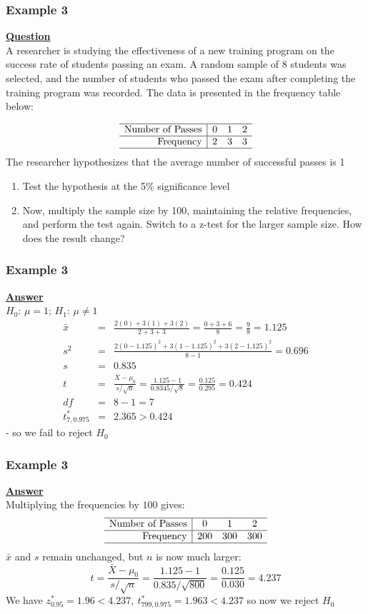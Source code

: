 \documentclass[t,8pt]{beamer}%
\begin{document}
\begin{frame}
	\frametitle{Example 3}
    {\bf\underline{Question}} \\
    A researcher is studying the effectiveness of a new training program on the success rate of students passing an exam. A random sample of 8 students was selected, and the number of students who passed the exam after completing the training program was recorded. The data is presented in the frequency table below:

\[
\begin{array}{r|ccc}
\hline
\text{Number of Passes} & 0 & 1 & 2 \\
\hline
\text{Frequency} & 2 & 3 & 3 \\
\hline
\end{array}
\]
The researcher hypothesizes that the average number of successful passes is 1
\begin{enumerate}
    \item Test the hypothesis at the 5\% significance level
    \item Now, multiply the sample size by 100, maintaining the relative frequencies, and perform the test again. Switch to a z-test for the larger sample size. How does the result change?
\end{enumerate}
\end{frame}

\begin{frame}
	\frametitle{Example 3}
    {\bf\underline{Answer}} \\
    $H_0$: $\mu=1$; $H_1$: $\mu\neq 1$
    \begin{eqnarray*}
        \bar{x} &=& \frac{2(0) + 3(1) + 3(2)}{2 + 3 + 3} = \frac{0 + 3 + 6}{8} = \frac{9}{8} = 1.125 \\
        s^2 &=& \frac{2(0 - 1.125)^2 + 3(1 - 1.125)^2 + 3(2 - 1.125)^2}{8 - 1}=0.696 \\
        s &=& 0.835 \\
        t &=& \frac{\bar{X} - \mu_0}{s / \sqrt{n}} = \frac{1.125 - 1}{0.8345 / \sqrt{8}} = \frac{0.125}{0.295} = 0.424 \\
        df &=& 8 - 1 = 7 \\
        t^*_{7,0.975} &=& 2.365>0.424
    \end{eqnarray*}
    - so we fail to reject $H_0$
\end{frame}

\begin{frame}
	\frametitle{Example 3}
    {\bf\underline{Answer}} \\
    Multiplying the frequencies by $100$ gives:
    \[
\begin{array}{r|ccc}
\hline
\text{Number of Passes} & 0 & 1 & 2 \\
\hline
\text{Frequency} & 200 & 300 & 300 \\
\hline
\end{array}
\]
$\bar x$ and $s$ remain unchanged, but $n$ is now much larger:
$$t=\frac{\bar{X} - \mu_0}{s / \sqrt{n}} = \frac{1.125 - 1}{0.835 / \sqrt{800}} = \frac{0.125}{0.030} = 4.237$$
We have $z^*_{0.95}=1.96<4.237,\ t^*_{799,0.975}=1.963<4.237$ so now we reject $H_0$
\end{frame}
\end{document}
